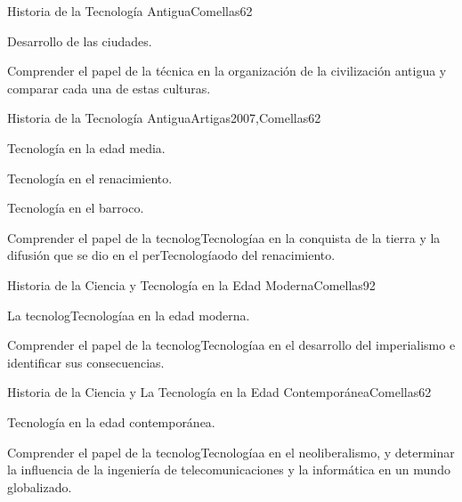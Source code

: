 \begin{syllabus}
\begin{unit}{Historia de la Tecnología Antigua}{Comellas}{6}{2}
\begin{topics}
    \item Desarrollo de las ciudades.
\end{topics}
\begin{learningoutcomes}
    \item Comprender el papel de la técnica en la organización de la civilización antigua y comparar cada una de estas culturas.
\end{learningoutcomes}
\end{unit}

\begin{unit}{Historia de la Tecnología Antigua}{Artigas2007,Comellas}{6}{2}
\begin{topics}
    \item Tecnología en la edad media.
    \item Tecnología en el renacimiento.
    \item Tecnología en el barroco.
\end{topics}
\begin{learningoutcomes}
    \item Comprender el  papel de la tecnologTecnologíaa en la conquista de la tierra y la difusión que se dio en el perTecnologíaodo del renacimiento.
\end{learningoutcomes}

\end{unit}

\begin{unit}{Historia de la Ciencia y Tecnología en la Edad Moderna}{Comellas}{9}{2}
\begin{topics}
      \item {La tecnologTecnologíaa en la edad moderna.}
\end{topics}
\begin{learningoutcomes}
	\item Comprender el  papel de la tecnologTecnologíaa en el desarrollo del imperialismo e identificar sus consecuencias.
\end{learningoutcomes}
\end{unit}

\begin{unit}{Historia de la Ciencia y La Tecnología en la Edad Contemporánea}{Comellas}{6}{2}
\begin{topics}
      \item {Tecnología en la edad contemporánea.}
\end{topics}
\begin{learningoutcomes}
	\item Comprender el  papel de la tecnologTecnologíaa en el neoliberalismo, y determinar la influencia de la ingeniería de telecomunicaciones y la informática en un mundo globalizado.
\end{learningoutcomes}
\end{unit}


\end{syllabus}
